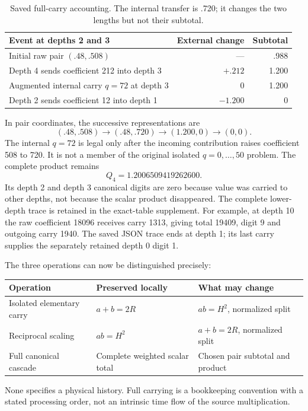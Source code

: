 \documentclass[11pt,a4paper]{article}
\begin{document}
\begin{table}[ht]
\centering\small
\begin{tabular}{@{}p{.56\linewidth}rr@{}}
\toprule
Event at depths 2 and 3 & External change & Subtotal\\\midrule
Initial raw pair $(.48,.508)$ & --- & .988\\
Depth 4 sends coefficient 212 into depth 3 & $+.212$ & 1.200\\
Augmented internal carry $q=72$ at depth 3 & 0 & 1.200\\
Depth 2 sends coefficient 12 into depth 1 & $-1.200$ & 0\\\bottomrule
\end{tabular}
\caption{Saved full-carry accounting. The internal transfer is .720; it changes the two lengths but not their subtotal.}
\label{tab:fullcarry}
\end{table}
In pair coordinates, the successive representations are
\begin{equation}
(.48,.508)\longrightarrow(.48,.720)
\longrightarrow(1.200,0)\longrightarrow(0,0).
\label{eq:fullcarry}
\end{equation}
The internal $q=72$ is legal only after the incoming contribution raises coefficient 508 to 720. It is not a member of the original isolated $q=0,\ldots,50$ problem. The complete product remains
\begin{equation}
Q_4=1.2006509419262600.
\label{eq:Q4}
\end{equation}
Its depth 2 and depth 3 canonical digits are zero because value was carried to other depths, not because the scalar product disappeared. The complete lower-depth trace is retained in the exact-table supplement. For example, at depth 10 the raw coefficient 18096 receives carry 1313, giving total 19409, digit 9 and outgoing carry 1940. The saved JSON trace ends at depth 1; its last carry supplies the separately retained depth 0 digit 1.

The three operations can now be distinguished precisely:
\begin{center}\small
\begin{tabular}{@{}p{.29\linewidth}p{.30\linewidth}p{.32\linewidth}@{}}
\toprule
Operation & Preserved locally & What may change\\\midrule
Isolated elementary carry & $a+b=2R$ & $ab=H^2$, normalized split\\
Reciprocal scaling & $ab=H^2$ & $a+b=2R$, normalized split\\
Full canonical cascade & Complete weighted scalar total & Chosen pair subtotal and product\\\bottomrule
\end{tabular}
\end{center}
None specifies a physical history. Full carrying is a bookkeeping convention with a stated processing order, not an intrinsic time flow of the source multiplication.
\end{document}
